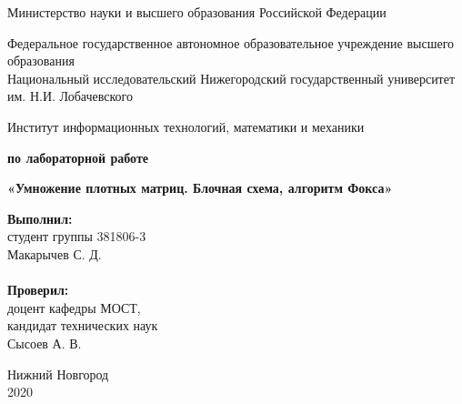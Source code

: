 \documentclass{report}
\begin{document}
\begin{titlepage}

\begin{center}
Министерство науки и высшего образования Российской Федерации
\end{center}

\begin{center}
Федеральное государственное автономное образовательное учреждение высшего образования \\
Национальный исследовательский Нижегородский государственный университет им. Н.И. Лобачевского
\end{center}

\begin{center}
Институт информационных технологий, математики и механики
\end{center}

\vspace{4em}

\begin{center}
\textbf{ по лабораторной работе} \\
\end{center}
\begin{center}
\textbf{\Large«Умножение плотных матриц. Блочная схема, алгоритм Фокса»} \\
\end{center}

\vspace{4em}

\newbox{\lbox}
\newlength{\maxl}
\setlength{\maxl}{\wd\lbox}
\hfill\parbox{7cm}{
\hspace*{5cm}\hspace*{-5cm}\textbf{Выполнил:} \\ студент группы 381806-3 \\ Макарычев С. Д.\\
\\
\hspace*{5cm}\hspace*{-5cm}\textbf{Проверил:}\\ доцент кафедры МОСТ, \\ кандидат технических наук \\ Сысоев А. В.\\
}
\vspace{\fill}

\begin{center} Нижний Новгород \\ 2020 \end{center}

\end{titlepage}
\end{document}

